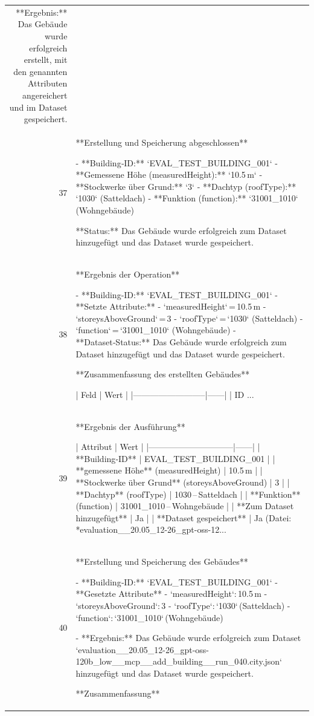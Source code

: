 \documentclass[a4paper,11pt]{article}
\begin{document}
\begin{table}[ht]
\begin{tabular}{r p{12cm}}
**Ergebnis:** Das Gebäude wurde erfolgreich erstellt, mit den genannten Attributen angereichert und im Dataset gespeichert. \\
37 & **Erstellung und Speicherung abgeschlossen**

- **Building‑ID:** `EVAL\_TEST\_BUILDING\_001`  
- **Gemessene Höhe (measuredHeight):** `10.5 m`  
- **Stockwerke über Grund:** `3`  
- **Dachtyp (roofType):** `1030` (Satteldach)  
- **Funktion (function):** `31001\_1010` (Wohngebäude)  

**Status:** Das Gebäude wurde erfolgreich zum Dataset hinzugefügt und das Dataset wurde gespeichert. \\
38 & **Ergebnis der Operation**

- **Building-ID:** `EVAL\_TEST\_BUILDING\_001`  
- **Setzte Attribute:**  
  - `measuredHeight` = 10.5 m  
  - `storeysAboveGround` = 3  
  - `roofType` = `1030` (Satteldach)  
  - `function` = `31001\_1010` (Wohngebäude)  
- **Dataset‑Status:** Das Gebäude wurde erfolgreich zum Dataset hinzugefügt und das Dataset wurde gespeichert.

**Zusammenfassung des erstellten Gebäudes**

| Feld                     | Wert |
|--------------------------|------|
| ID                   ... \\
39 & **Ergebnis der Ausführung**

| Attribut                     | Wert |
|------------------------------|------|
| **Building‑ID**              | EVAL\_TEST\_BUILDING\_001 |
| **gemessene Höhe** (measuredHeight) | 10.5 m |
| **Stockwerke über Grund** (storeysAboveGround) | 3 |
| **Dachtyp** (roofType)       | 1030 – Satteldach |
| **Funktion** (function)      | 31001\_1010 – Wohngebäude |
| **Zum Dataset hinzugefügt** | Ja |
| **Dataset gespeichert**      | Ja (Datei: *evaluation\_\_20.05\_12-26\_gpt-oss-12... \\
40 & **Erstellung und Speicherung des Gebäudes**

- **Building‑ID:** `EVAL\_TEST\_BUILDING\_001`  
- **Gesetzte Attribute**  
  - `measuredHeight`: 10.5 m  
  - `storeysAboveGround`: 3  
  - `roofType`: `1030` (Satteldach)  
  - `function`: `31001\_1010` (Wohngebäude)  

- **Ergebnis:** Das Gebäude wurde erfolgreich zum Dataset `evaluation\_\_20.05\_12-26\_gpt-oss-120b\_low\_\_mcp\_\_add\_building\_\_run\_040.city.json` hinzugefügt und das Dataset wurde gespeichert.  

**Zusammenfassung**


\end{tabular}
\end{table}
\end{document}
